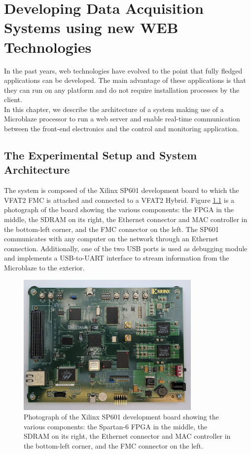 \chapter{Developing Data Acquisition Systems using new WEB Technologies}
\label{chap:III-2-web-daq}

  In the past years, web technologies have evolved to the point that fully fledged applications can be developed. The main advantage of these applications is that they can run on any platform and do not require installation processes by the client. \\

  In this chapter, we describe the architecture of a system making use of a Microblaze processor to run a web server and enable real-time communication between the front-end electronics and the control and monitoring application.

  \section{The Experimental Setup and System Architecture}

    The system is composed of the Xilinx SP601 development board to which the VFAT2 FMC is attached and connected to a VFAT2 Hybrid. Figure \ref{fig:III-2-sp601} is a photograph of the board showing the various components: the FPGA in the middle, the SDRAM on its right, the Ethernet connector and MAC controller in the bottom-left corner, and the FMC connector on the left. The SP601 communicates with any computer on the network through an Ethernet connection. Additionally, one of the two USB ports is used as debugging module and implements a USB-to-UART interface to stream information from the Microblaze to the exterior. \\

    \begin{figure}[h!]
      \centering
      \includegraphics[width=0.8\textwidth]{img/III-2-web-daq/sp601.jpg}
      \caption{Photograph of the Xilinx SP601 development board showing the various components: the Spartan-6 FPGA in the middle, the SDRAM on its right, the Ethernet connector and MAC controller in the bottom-left corner, and the FMC connector on the left.}
      \label{fig:III-2-sp601}
    \end{figure}

